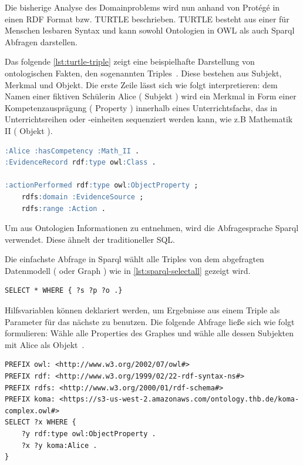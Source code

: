 \documentclass[
12pt,
english,
ngerman,
headsepline,
twoside,
openright,
numbers=noenddot,version=first
]{scrreprt}
\begin{document}

Die bisherige Analyse des Domainproblems wird nun anhand von Protégé in einen \acrfull{RDF} Format bzw. \acrfull{TURTLE} beschrieben. \acrshort{TURTLE} besteht aus einer für Menschen lesbaren Syntax und kann sowohl Ontologien in \acrshort{OWL} als auch \acrshort{Sparql} Abfragen darstellen. 

Das folgende \autoref{lst:turtle-triple} zeigt eine beispielhafte Darstellung von ontologischen Fakten, den sogenannten \glqq Triples\grqq\ . Diese bestehen aus Subjekt, Merkmal und Objekt. Die erste Zeile lässt sich wie folgt interpretieren: dem Namen einer fiktiven Schülerin Alice ( Subjekt ) wird ein Merkmal in Form einer Kompetenzausprägung ( Property ) innerhalb eines Unterrichtsfachs, das in Unterrichtsreihen oder -einheiten sequenziert werden kann, wie z.B Mathematik II ( Objekt ).

\begin{lstlisting}[language=SQL,caption={Darstellung von Triples in TURTLE},label={lst:turtle-triple}]
:Alice :hasCompetency :Math_II .
:EvidenceRecord rdf:type owl:Class .

:actionPerformed rdf:type owl:ObjectProperty ;
	rdfs:domain :EvidenceSource ;
	rdfs:range :Action .
\end{lstlisting}

Um aus Ontologien Informationen zu entnehmen, wird die Abfragesprache \acrfull{Sparql} 
verwendet. Diese ähnelt der traditioneller SQL. 

Die einfachste Abfrage in Sparql wählt alle Triples von dem abgefragten Datenmodell ( oder Graph ) wie in \autoref{lst:sparql-selectall} gezeigt wird.

\begin{lstlisting}[language=Sparql,caption={Sparql SELECT ALL},label={lst:sparql-selectall}]
SELECT * WHERE { ?s ?p ?o .}
\end{lstlisting}

Hilfsvariablen können deklariert werden, um Ergebnisse aus einem Triple als Parameter für das nächste zu benutzen. Die folgende Abfrage ließe sich wie folgt formulieren: \glqq Wähle alle Properties des Graphes und wähle alle dessen Subjekten mit Alice als Objekt\grqq\ . \\
\begin{lstlisting}
PREFIX owl: <http://www.w3.org/2002/07/owl#>
PREFIX rdf: <http://www.w3.org/1999/02/22-rdf-syntax-ns#>
PREFIX rdfs: <http://www.w3.org/2000/01/rdf-schema#>
PREFIX koma: <https://s3-us-west-2.amazonaws.com/ontology.thb.de/koma-complex.owl#>
SELECT ?x WHERE {
	?y rdf:type owl:ObjectProperty .
	?x ?y koma:Alice .
}
\end{lstlisting}
\end{document}
